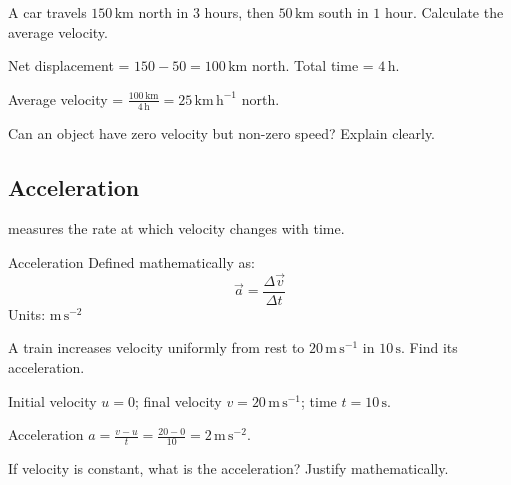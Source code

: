 \begin{example}
A car travels $150\,\mathrm{km}$ north in $3$ hours, then $50\,\mathrm{km}$ south in $1$ hour. Calculate the average velocity.
\end{example}

\begin{solution}
Net displacement = $150 - 50 = 100\,\mathrm{km}$ north. Total time = $4\,\mathrm{h}$.

Average velocity = $\frac{100\,\mathrm{km}}{4\,\mathrm{h}} = 25\,\mathrm{km\,h^{-1}}$ north.
\end{solution}

\begin{stopandthink}
Can an object have zero velocity but non-zero speed? Explain clearly.
\end{stopandthink}

\FloatBarrier

\subsection{Acceleration}
\FloatBarrier

 measures the rate at which velocity changes with time.

\begin{keyconcept}{Acceleration}
Defined mathematically as:
\[
\vec{a} = \frac{\Delta \vec{v}}{\Delta t}
\]
Units: $\mathrm{m\,s^{-2}}$
\end{keyconcept}


\begin{example}
A train increases velocity uniformly from rest to $20\,\mathrm{m\,s^{-1}}$ in $10\,\mathrm{s}$. Find its acceleration.
\end{example}

\begin{solution}
Initial velocity $u = 0$; final velocity $v = 20\,\mathrm{m\,s^{-1}}$; time $t = 10\,\mathrm{s}$.

Acceleration $a = \frac{v - u}{t} = \frac{20 - 0}{10} = 2\,\mathrm{m\,s^{-2}}$.
\end{solution}

\begin{stopandthink}
If velocity is constant, what is the acceleration? Justify mathematically.
\end{stopandthink}

